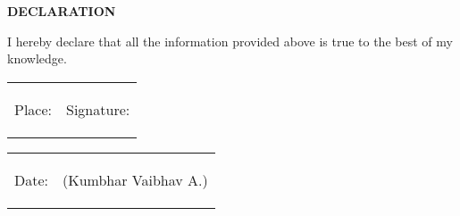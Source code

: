 \documentclass{article}
\begin{document}
\begin{minipage}{\textwidth}
\begin{framed}
	\large{\textbf{DECLARATION}}
\end{framed}
	\large{\setlength{\parindent}{15pt} \indent I hereby declare that all the information provided above is true to the best of my knowledge. }


\vspace{3cm}
\begin{tabular}{cc}
\begin{minipage}{0.5\textwidth}
\begin{flushleft}Place:
\end{flushleft}
\end{minipage}
&
\begin{minipage}{0.5\textwidth}
\begin{center}Signature:
\end{center}
\end{minipage}
\end{tabular}


\begin{tabular}{cc}
\begin{minipage}{0.5\textwidth}
\begin{flushleft}Date:
\end{flushleft}
\end{minipage}
&
\begin{minipage}{0.5\textwidth}
\begin{center} (Kumbhar Vaibhav A.)
\end{center}
\end{minipage}
\end{tabular}

\end{minipage}
\end{document}
